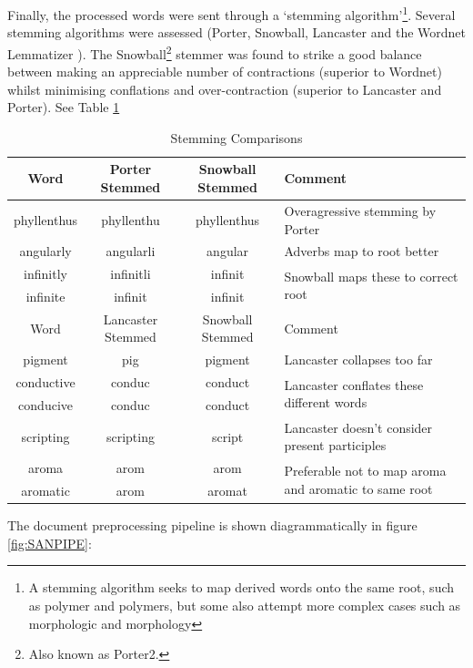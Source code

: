 Finally, the processed words were sent through a `stemming algorithm'\footnote{A stemming algorithm seeks to map derived words onto the same root, such as polymer and polymers, but some also attempt more complex cases such as morphologic and morphology}. Several stemming algorithms were assessed (Porter\cite{porter}, Snowball\cite{snowball}\cite{nltk}, Lancaster \cite{lancaster} and the Wordnet Lemmatizer \cite{wordnet1}\cite{wordnet2}\cite{wordnet3}). The Snowball\footnote{Also known as Porter2.} stemmer was found to strike a good balance between making an appreciable number of contractions (superior to Wordnet) whilst minimising conflations and over-contraction (superior to Lancaster and Porter). See Table \ref{tab:stems}
\begin{table}[H]
\begin{center}
\caption{Stemming Comparisons}
\label{tab:stems}
\begin{tabular}{||c|c|c|p{5cm}||}
\hline
Word & Porter Stemmed & Snowball Stemmed & Comment\\
\hline     
phyllenthus & phyllenthu & phyllenthus & Overagressive stemming by Porter\\
\hline
angularly & angularli & angular & Adverbs map to root better\\
\hline
infinitly & infinitli & infinit & \multirow{2}{5cm}{Snowball maps these to correct root}\\
\cline{1-3}
infinite & infinit & infinit&\\
\hline
\hline
Word & Lancaster Stemmed & Snowball Stemmed & Comment\\
\hline
pigment & pig & pigment & Lancaster collapses too far\\
\hline
conductive & conduc & conduct & \multirow{2}{5cm}{Lancaster conflates these different words}\\
\cline{1-3}
conducive & conduc & conduct & \\
\hline
scripting & scripting & script & Lancaster doesn't consider present participles\\
\hline
aroma & arom & arom & \multirow{2}{5cm}{Preferable not to map aroma and aromatic to same root}\\
\cline{1-3}
aromatic & arom & aromat & \\
\hline
\end{tabular}
\end{center}
\end{table}

The document preprocessing pipeline is shown diagrammatically in figure \ref{fig:SANPIPE}:

